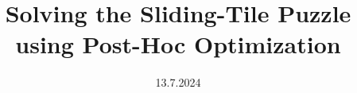 \documentclass[a4paper, 10pt, oneside]{memoir}
\title				{Solving the Sliding-Tile Puzzle using Post-Hoc Optimization}
\date				{13.7.2024} %
\begin{document}

\thesisfront
\maketitle
\pagestyle{thesis}
% 

\thesistoc
\thesismain



%
%
%
%
\thesisappendix
\thesisbib
\begin{appendices}
	 
\end{appendices}
\thesisback
{}
  {}
  {}
\end{document}

